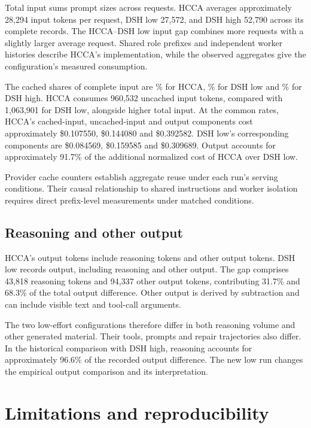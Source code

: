 \documentclass[10pt,a4paper]{article}
\begin{document}
Total input sums prompt sizes across requests. HCCA averages approximately
28,294 input tokens per request, DSH low 27,572, and DSH high 52,790 across
its complete records. The HCCA--DSH low input gap combines more requests with
a slightly larger average request. Shared role prefixes and independent worker
histories describe HCCA's implementation, while the observed aggregates give
the configuration's measured consumption.

The cached shares of complete input are \HCachePct{}\% for HCCA,
\LCachePct{}\% for DSH low and \BCachePct{}\% for DSH high. HCCA consumes
960,532 uncached input tokens, compared with 1,063,901 for DSH low, alongside
higher total input. At the common rates, HCCA's cached-input, uncached-input
and output components cost approximately \$0.107550, \$0.144080 and
\$0.392582. DSH low's corresponding components are \$0.084569, \$0.159585
and \$0.309689. Output accounts for approximately 91.7\% of the additional
normalized cost of HCCA over DSH low.

Provider cache counters establish aggregate reuse under each run's serving
conditions. Their causal relationship to shared instructions and worker
isolation requires direct prefix-level measurements under matched conditions.

\subsection{Reasoning and other output}

HCCA's \HOutput{} output tokens include \HReasoning{} reasoning tokens and
\HOtherOutput{} other output tokens. DSH low records \LOutput{} output,
including \LReasoning{} reasoning and \LOtherOutput{} other output. The gap
comprises 43,818 reasoning tokens and 94,337 other output tokens, contributing
31.7\% and 68.3\% of the total output difference. Other output is derived by
subtraction and can include visible text and tool-call arguments.

The two low-effort configurations therefore differ in both reasoning volume
and other generated material. Their tools, prompts and repair trajectories
also differ. In the historical comparison with DSH high, reasoning accounts
for approximately 96.6\% of the recorded output difference. The new low run
changes the empirical output comparison and its interpretation.

\section{Limitations and reproducibility}
\end{document}
